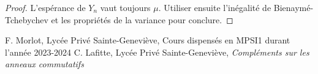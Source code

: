\documentclass[french]{book}
\theoremstyle{plain}
\theoremstyle{definition}
\theoremstyle{remark}
\begin{document}
\begin{proof}
	L'espérance de $Y_n$ vaut toujours $\mu$. Utiliser ensuite l'inégalité de Bienaymé-Tchebychev et les propriétés de la variance pour conclure.
\end{proof}

\begin{thebibliography}{}
	 F. Morlot, Lycée Privé Sainte-Geneviève, Cours dispensés en MPSI1 durant l'année 2023-2024
	 C. Lafitte, Lycée Privé Sainte-Geneviève, \textit{Compléments sur les anneaux commutatifs}
\end{thebibliography}
\end{document}
